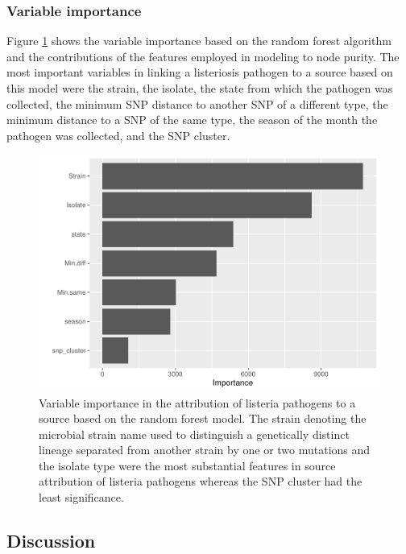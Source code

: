 \documentclass[
  10pt,
]{article}
\begin{document}
\hypertarget{variable-importance}{%
\subsubsection{Variable importance}\label{variable-importance}}

Figure \ref{fig:figure-five} shows the variable importance based on the random forest algorithm and the contributions of the features employed in modeling to node purity. The most important variables in linking a listeriosis pathogen to a source based on this model were the strain, the isolate, the state from which the pathogen was collected, the minimum SNP distance to another SNP of a different type, the minimum distance to a SNP of the same type, the season of the month the pathogen was collected, and the SNP cluster.

\begin{figure}[H]

{\centering \includegraphics{php2550_final_manuscript_files/figure-latex/figure-five-1} 

}

\caption{Variable importance in the attribution of listeria pathogens to a source based on the random forest model. The strain denoting the microbial strain name used to distinguish a genetically distinct lineage separated from another strain by one or two mutations and the isolate type were the most substantial features in source attribution of listeria pathogens whereas the SNP cluster had the least significance.}\label{fig:figure-five}
\end{figure}

\hypertarget{discussion}{%
\subsection{Discussion}\label{discussion}}
\end{document}
